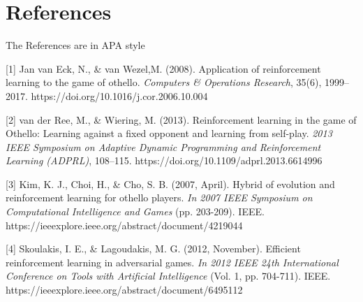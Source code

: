 \documentclass[../proposal.tex]{subfiles}
\begin{document}
\section*{References}

The References are in APA style
\medskip



\small


[1] Jan van Eck, N., \& van Wezel,M. (2008).
 Application of reinforcement learning to the game of othello. 
{\it Computers \& Operations Research}, 35(6), 1999–2017. https://doi.org/10.1016/j.cor.2006.10.004 

[2] van der Ree, M., \& Wiering, M. (2013).
Reinforcement learning in the game of Othello: Learning against a fixed opponent and learning from self-play. 
{\it 2013 IEEE Symposium on Adaptive Dynamic Programming and Reinforcement Learning (ADPRL)}, 108–115. https://doi.org/10.1109/adprl.2013.6614996 

[3] Kim, K. J., Choi, H., \& Cho, S. B. (2007, April). 
Hybrid of evolution and reinforcement learning for othello players. 
{\it In 2007 IEEE Symposium on Computational Intelligence and Games} (pp. 203-209). IEEE. https://ieeexplore.ieee.org/abstract/document/4219044

[4] Skoulakis, I. E., \& Lagoudakis, M. G. (2012, November). 
Efficient reinforcement learning in adversarial games. 
{\it In 2012 IEEE 24th International Conference on Tools with Artificial Intelligence} (Vol. 1, pp. 704-711). IEEE. https://ieeexplore.ieee.org/abstract/document/6495112
\end{document}

